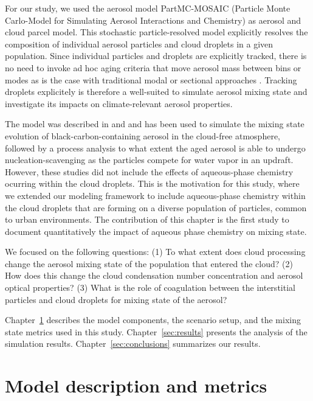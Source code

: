 \documentclass[edeposit,fullpage]{uiucthesis2009}
\begin{document}
For our study, we used the aerosol model PartMC-MOSAIC (Particle Monte
Carlo-Model for Simulating Aerosol Interactions and Chemistry)
\citep{Riemer2009,Zaveri2008} as aerosol and cloud parcel model. This
stochastic particle-resolved model explicitly resolves the composition
of individual aerosol particles and cloud droplets in a given
population. Since individual particles and droplets are explicitly
tracked, there is no need to invoke ad hoc aging criteria that move
aerosol mass between bins or modes as is the case with traditional
modal or sectional approaches \citep{Riemer2003,Stier2005,
  Bauer2008,Jacobson2001}. Tracking droplets explicitely is therefore
a well-suited to simulate aerosol mixing state and investigate its
impacts on climate-relevant aerosol properties.

The model was described in \citet{ching2012impacts} and \citet{Ching2016} and
has been used to simulate the mixing state evolution of
black-carbon-containing aerosol in the cloud-free atmosphere, followed
by a process analysis to what extent the aged aerosol is able to
undergo nucleation-scavenging as the particles compete for water vapor
in an updraft. However, these studies did not include the effects of
aqueous-phase chemistry ocurring within the cloud droplets. This is
the motivation for this study, where we extended our modeling framework
to include aqueous-phase chemistry within the cloud droplets that are
forming on a diverse population of particles, common to urban
environments. The contribution of this chapter is the first study to
document quantitatively the impact of aqueous phase
chemistry on mixing state.

We focused on the following questions: (1) To what extent does cloud
processing change the aerosol mixing state of the population that
entered the cloud? (2) How does this change the cloud condensation
number concentration and aerosol optical properties? (3) What
is the role of coagulation between the interstitial particles and
cloud droplets for mixing state of the aerosol?

Chapter~\ref{sec:model} describes the model components, the scenario
setup, and the mixing state metrics used in this
study. Chapter~\ref{sec:results} presents the analysis of the
simulation results. Chapter~\ref{sec:conclusions} summarizes our
results.
%

\section{Model description and metrics}
\label{sec:model}
\end{document}
